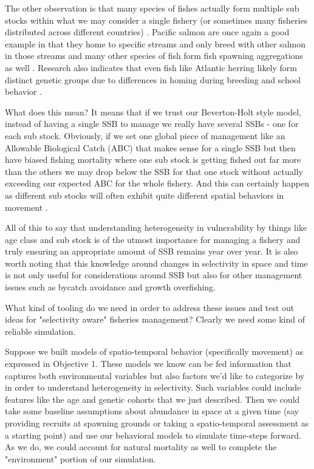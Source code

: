 \documentclass[11pt]{article}
\begin{document}
The other observation is that many species of fishes actually form multiple sub stocks within what we may consider a single fishery (or sometimes many fisheries distributed across different countries) \cite{lorenzen2010} \cite{salmonplan} \cite{prince2010}. Pacific salmon are once again a good example in that they home to specific streams and only breed with other salmon in those streams and many other species of fish form fish spawning aggregations as well \cite{erisman2017}. Research also indicates that even fish like Atlantic herring likely form distinct genetic groups due to differences in homing during breeding and school behavior \cite{armstrong2001}. 

What does this mean? It means that if we trust our Beverton-Holt style model, instead of having a single SSB to manage we really have several SSBs - one for each sub stock. Obviously, if we set one global piece of management like an Allowable Biological Catch (ABC) that makes sense for a single SSB but then have biased fishing mortality where one sub stock is getting fished out far more than the others we may drop below the SSB for that one stock without actually exceeding our expected ABC for the whole fishery. And this can certainly happen as different sub stocks will often exhibit quite different spatial behaviors in movement \cite{tucker2019} \cite{punt2019} \cite{cadrin2020}. \newline

All of this to say that understanding heterogeneity in vulnerability by things like age class and sub stock is of the utmost importance for managing a fishery and truly ensuring an appropriate amount of SSB remains year over year. It is also worth noting that this knowledge around changes in selectivity in space and time is not only useful for considerations around SSB but also for other management issues such as bycatch avoidance and growth overfishing. 

What kind of tooling do we need in order to address these issues and test out ideas for "selectivity aware" fisheries management? Clearly we need some kind of reliable simulation. \newline

Suppose we built models of spatio-temporal behavior (specifically movement) as expressed in Objective 1. These models we know can be fed information that captures both environmental variables but also factors we'd like to categorize by in order to understand heterogeneity in selectivity. Such variables could include features like the age and genetic cohorts that we just described. Then we could take some baseline assumptions about abundance in space at a given time (say providing recruits at spawning grounds or taking a spatio-temporal assessment as a starting point) and use our behavioral models to simulate time-steps forward. As we do, we could account for natural mortality as well to complete the "environment" portion of our simulation. 
\end{document}
